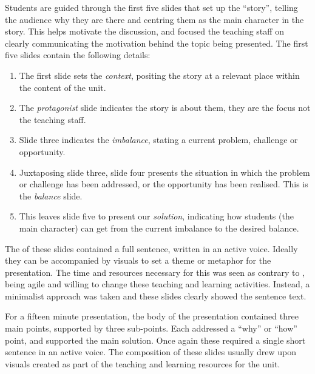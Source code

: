 Students are guided through the first five slides that set up the ``story'', telling the audience why they are there and centring them as the main character in the story. This helps motivate the discussion, and focused the teaching staff on clearly communicating the motivation behind the topic being presented. The first five slides contain the following details:
\begin{enumerate}
	\item The first slide sets the \emph{context}, positing the story at a relevant place within the content of the unit.
	\item The \emph{protagonist} slide indicates the story is about them, they are the focus not the teaching staff.
	\item Slide three indicates the \emph{imbalance}, stating a current problem, challenge or opportunity.
	\item Juxtaposing slide three, slide four presents the situation in which the problem or challenge has been addressed, or the opportunity has been realised. This is the \emph{balance} slide.
	\item This leaves slide five to present our \emph{solution}, indicating how students (the main character) can get from the current imbalance to the desired balance.
\end{enumerate}

The of these slides contained a full sentence, written in an active voice. Ideally they can be accompanied by visuals to set a theme or metaphor for the presentation. The time and resources necessary for this was seen as contrary to , being agile and willing to change these teaching and learning activities. Instead, a minimalist approach was taken and these slides clearly showed the sentence text.

For a fifteen minute presentation, the body of the presentation contained three main points, supported by three sub-points. Each addressed a ``why'' or ``how'' point, and supported the main solution. Once again these required a single short sentence in an active voice. The composition of these slides usually drew upon visuals created as part of the teaching and learning resources for the unit.

